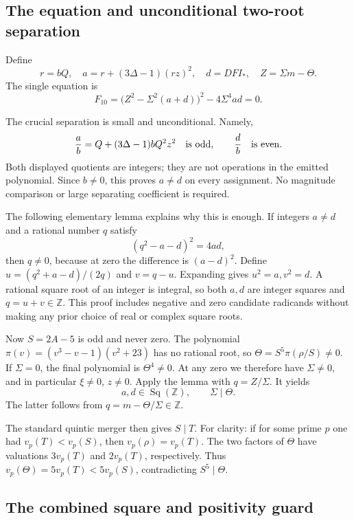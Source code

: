 \subsection{The equation and unconditional two-root
separation}\label{the-equation-and-unconditional-two-root-separation}

Define \[
 r=bQ,\quad a=r+(3\Delta-1)(rz)^2,
 \quad d=DFI_*,\quad Z=\Sigma m-\Theta.
\] The single equation is \[
 \boxed{F_{10}=\bigl(Z^2-\Sigma^2(a+d)\bigr)^2
                  -4\Sigma^4ad=0.}
\]

The crucial separation is small and unconditional. Namely, \[
 \frac ab=Q+(3\Delta-1)bQ^2z^2\quad\hbox{is odd},\qquad
 \frac db\quad\hbox{is even}.
\] Both displayed quotients are integers; they are not operations in the
emitted polynomial. Since \(b\ne0\), this proves \(a\ne d\) on every
assignment. No magnitude comparison or large separating coefficient is
required.

The following elementary lemma explains why this is enough. If integers
\(a\ne d\) and a rational number \(q\) satisfy \[
 (q^2-a-d)^2=4ad,
\] then \(q\ne0\), because at zero the difference is \((a-d)^2\). Define
\(u=(q^2+a-d)/(2q)\) and \(v=q-u\). Expanding gives \(u^2=a,v^2=d\). A
rational square root of an integer is integral, so both \(a,d\) are
integer squares and \(q=u+v\in\mathbb Z\). This proof includes negative
and zero candidate radicands without making any prior choice of real or
complex square roots.

Now \(S=2A-5\) is odd and never zero. The polynomial
\(\pi(v)=(v^3-v-1)(v^2+23)\) has no rational root, so
\(\Theta=S^5\pi(\rho/S)\ne0\). If \(\Sigma=0\), the final polynomial is
\(\Theta^4\ne0\). At any zero we therefore have \(\Sigma\ne0\), and in
particular \(\xi\ne0\), \(z\ne0\). Apply the lemma with \(q=Z/\Sigma\).
It yields \[
 a,d\in\operatorname{Sq}(\mathbb Z),\qquad \Sigma\mid\Theta.
\] The latter follows from \(q=m-\Theta/\Sigma\in\mathbb Z\).

The standard quintic merger then gives \(S\mid T\). For clarity: if for
some prime \(p\) one had \(v_p(T)<v_p(S)\), then \(v_p(\rho)=v_p(T)\).
The two factors of \(\Theta\) have valuations \(3v_p(T)\) and
\(2v_p(T)\), respectively. Thus \(v_p(\Theta)=5v_p(T)<5v_p(S)\),
contradicting \(S^5\mid\Theta\).

\subsection{The combined square and positivity
guard}\label{the-combined-square-and-positivity-guard}

